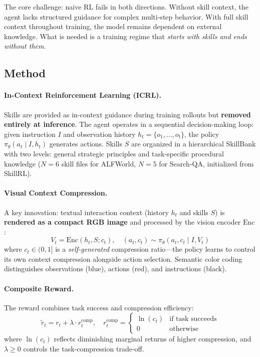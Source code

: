 \documentclass[11pt]{article}
\begin{document}
The core challenge: naive RL fails in both directions. Without skill context, the agent lacks structured guidance for complex multi-step behavior. With full skill context throughout training, the model remains dependent on external knowledge. What is needed is a training regime that \textit{starts with skills and ends without them}.

\subsection{Method}

\paragraph{In-Context Reinforcement Learning (ICRL).}
Skills are provided as in-context guidance during training rollouts but \textbf{removed entirely at inference}. The agent operates in a sequential decision-making loop: given instruction $I$ and observation history $h_t = \{o_1, \ldots, o_t\}$, the policy $\pi_\theta(a_t \mid I, h_t)$ generates actions. Skills $S$ are organized in a hierarchical SkillBank with two levels: general strategic principles and task-specific procedural knowledge ($N=6$ skill files for ALFWorld, $N=5$ for Search-QA, initialized from SkillRL).

\paragraph{Visual Context Compression.}
A key innovation: textual interaction context (history $h_t$ and skills $S$) is \textbf{rendered as a compact RGB image} and processed by the vision encoder $\mathrm{Enc}$:
\begin{equation}
    V_t = \mathrm{Enc}(h_t, S; c_t), \quad (a_t, c_t) \sim \pi_\theta(a_t, c_t \mid I, V_t)
\end{equation}
where $c_t \in (0,1]$ is a \textit{self-generated} compression ratio---the policy learns to control its own context compression alongside action selection. Semantic color coding distinguishes observations (blue), actions (red), and instructions (black).

\paragraph{Composite Reward.}
The reward combines task success and compression efficiency:
\begin{equation}
    \tilde{r}_t = r_t + \lambda \cdot r_t^{\mathrm{comp}}, \quad r_t^{\mathrm{comp}} = \begin{cases} \ln(c_t) & \text{if task succeeds} \\ 0 & \text{otherwise} \end{cases}
\end{equation}
where $\ln(c_t)$ reflects diminishing marginal returns of higher compression, and $\lambda \geq 0$ controls the task-compression trade-off.
\end{document}
